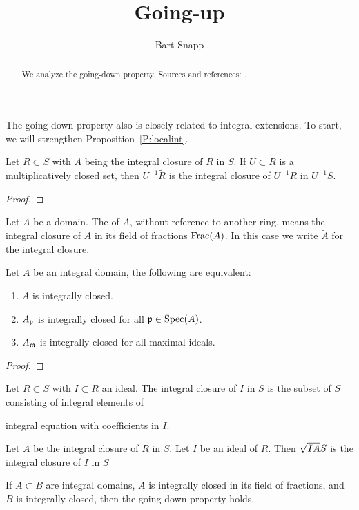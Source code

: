 \documentclass{ximera}
\author{Bart Snapp}
\title{Going-up}
\begin{document}
\begin{abstract}
  We analyze the going-down property. Sources and references:
  \cite{AM1969}.
\end{abstract}
\maketitle

The going-down property also is closely related to integral
extensions. To start, we will strengthen Proposition~\ref{P:localint}.


\begin{proposition}
  Let $R\subset S$ with $A$ being the integral closure of $R$
  in $S$. If $U\subset R$ is a multiplicatively closed set, then
  $U^{-1}\tilde{R}$ is the integral closure of $U^{-1}R$ in $U^{-1}S$.
  \begin{proof}
  \end{proof}
\end{proposition}


\begin{definition}
  Let $A$ be a domain. The  of $A$, without
  reference to another ring, means the integral closure of $A$ in its
  field of fractions $\operatorname{Frac}(A)$. In this case we write $\tilde{A}$ for
  the integral closure.
\end{definition}



\begin{proposition}
  Let $A$ be an integral domain, the following are equivalent:
  \begin{enumerate}
  \item $A$ is integrally closed.
  \item $A_{\mathfrak{p}}$ is integrally closed for all $\mathfrak{p}\in\operatorname{Spec}(A)$.
  \item $A_{\mathfrak{m}}$ is integrally closed for all maximal ideals.
  \end{enumerate}
  \begin{proof}
  \end{proof}
\end{proposition}


\begin{definition}
   Let $R\subset S$ with $I\subset R$ an ideal. The integral closure
   of $I$ in $S$ is the subset of $S$ consisting of integral elements of

   integral equation with coefficients in $I$.
\end{definition}


\begin{proposition}
  Let $A$ be the integral closure of $R$ in $S$. Let $I$ be an ideal
  of $R$. Then $\sqrt{IA}S$ is the integral closure of $I$  in $S$  
\end{proposition}


\begin{proposition}
\end{proposition}


\begin{theorem}
  If $A\subset B$ are integral domains, $A$ is integrally closed in
  its field of fractions, and $B$ is integrally closed, then the
  going-down property holds.
\end{theorem}
\end{document}
